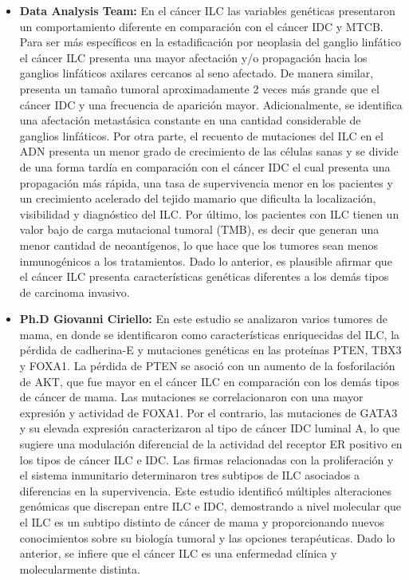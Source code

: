 \clearpage
{}
\begin{itemize}[label=\PencilRightDown]
	\item \textbf{Data Analysis Team:} En el cáncer ILC las variables genéticas presentaron un comportamiento diferente en comparación con el cáncer IDC y MTCB. Para ser más específicos en la estadificación por neoplasia del ganglio linfático el cáncer ILC presenta una mayor afectación y/o propagación hacia los ganglios linfáticos axilares cercanos al seno afectado. De manera similar, presenta un tamaño tumoral aproximadamente 2 veces más grande que el cáncer IDC y una frecuencia de aparición mayor. Adicionalmente, se identifica una afectación metastásica constante en una cantidad considerable de ganglios linfáticos. Por otra parte, el recuento de mutaciones del ILC en el ADN presenta un menor grado de crecimiento de las células sanas y se divide de una forma tardía en comparación con el cáncer IDC el cual presenta una propagación más rápida, una tasa de supervivencia menor en los pacientes y un crecimiento acelerado del tejido mamario que dificulta la localización, visibilidad y diagnóstico del ILC. Por último, los pacientes con ILC tienen un valor bajo de carga mutacional tumoral (TMB), es decir que generan una menor cantidad de neoantígenos, lo que hace que los tumores sean menos inmunogénicos a los tratamientos. Dado lo anterior, es plausible afirmar que el cáncer ILC presenta características genéticas diferentes a los demás tipos de carcinoma invasivo. 
	
	\item \textbf{Ph.D Giovanni Ciriello:} En este estudio se analizaron varios tumores de mama, en donde se identificaron como características enriquecidas del ILC, la pérdida de cadherina-E y mutaciones genéticas en las proteínas PTEN, TBX3 y FOXA1. La pérdida de PTEN se asoció con un aumento de la fosforilación de AKT, que fue mayor en el cáncer ILC en comparación con los demás tipos de cáncer de mama. Las mutaciones se correlacionaron con una mayor expresión y actividad de FOXA1. Por el contrario, las mutaciones de GATA3 y su elevada expresión caracterizaron al tipo de cáncer IDC luminal A, lo que sugiere una modulación diferencial de la actividad del receptor ER positivo en los tipos de cáncer ILC e IDC. Las firmas relacionadas con la proliferación y el sistema inmunitario determinaron tres subtipos de ILC asociados a diferencias en la supervivencia. Este estudio identificó múltiples alteraciones genómicas que discrepan entre ILC e IDC, demostrando a nivel molecular que el ILC es un subtipo distinto de cáncer de mama y proporcionando nuevos conocimientos sobre su biología tumoral y las opciones terapéuticas. Dado lo anterior, se infiere que el cáncer ILC es una enfermedad clínica y molecularmente distinta\cite{Ciriello2015}.
\end{itemize}

